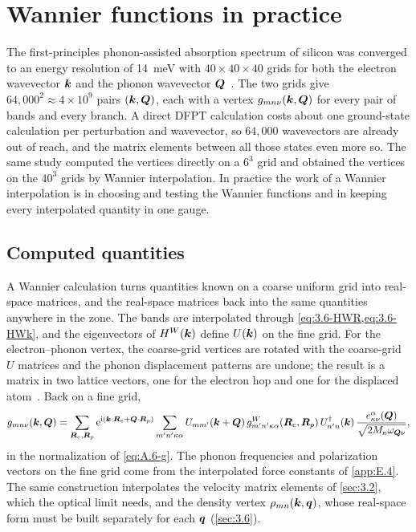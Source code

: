 \section{Wannier functions in practice}\label{app:E.5}

The first-principles phonon-assisted absorption spectrum of silicon was converged to an energy resolution of \SI{14}{meV} with $40\times40\times40$ grids for both the electron wavevector $\bm{k}$ and the phonon wavevector $\bm{Q}$~\cite{noffsinger2012phonon}. The two grids give $64{,}000^2 \approx 4\times10^{9}$ pairs $(\bm{k},\bm{Q})$, each with a vertex $g_{mn\nu}(\bm{k},\bm{Q})$ for every pair of bands and every branch. A direct DFPT calculation costs about one ground-state calculation per perturbation and wavevector, so $64{,}000$ wavevectors are already out of reach, and the matrix elements between all those states even more so. The same study computed the vertices directly on a $6^3$ grid and obtained the vertices on the $40^3$ grids by Wannier interpolation. In practice the work of a Wannier interpolation is in choosing and testing the Wannier functions and in keeping every interpolated quantity in one gauge.

\subsection{Computed quantities}

A Wannier calculation turns quantities known on a coarse uniform grid into real-space matrices, and the real-space matrices back into the same quantities anywhere in the zone. The bands are interpolated through \cref{eq:3.6-HWR,eq:3.6-HWk}, and the eigenvectors of $H^W(\bm{k})$ define $U(\bm{k})$ on the fine grid. For the electron--phonon vertex, the coarse-grid vertices are rotated with the coarse-grid $U$ matrices and the phonon displacement patterns are undone; the result is a matrix in two lattice vectors, one for the electron hop and one for the displaced atom~\cite[Eqs.~(177)--(179)]{giustino2017electron}. Back on a fine grid,
\begin{equation}
  g_{mn\nu}(\bm{k},\bm{Q}) = \sum_{\bm{R}_e,\bm{R}_p}\mathrm{e}^{\mathrm{i}(\bm{k}\cdot\bm{R}_e + \bm{Q}\cdot\bm{R}_p)}
  \sum_{m'n'\kappa\alpha}U_{mm'}(\bm{k}+\bm{Q})\,g^W_{m'n'\kappa\alpha}(\bm{R}_e,\bm{R}_p)\,U^\dagger_{n'n}(\bm{k})\,
  \frac{e^\alpha_{\kappa\nu}(\bm{Q})}{\sqrt{2M_\kappa\omega_{\bm{Q}\nu}}} ,
  \label{eq:E.5-ginterp}
\end{equation}
in the normalization of \cref{eq:A.6-g}. The phonon frequencies and polarization vectors on the fine grid come from the interpolated force constants of \cref{app:E.4}. The same construction interpolates the velocity matrix elements of \cref{sec:3.2}, which the optical limit needs, and the density vertex $\rho_{mn}(\bm{k},\bm{q})$, whose real-space form must be built separately for each $\bm{q}$ (\cref{sec:3.6}).

